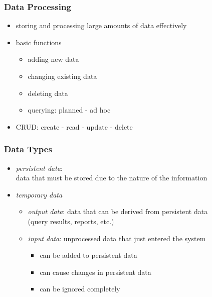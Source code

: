 \documentclass[dvipsnames]{beamer}
\theoremstyle{plain}
\begin{document}
\begin{frame}
  \frametitle{Data Processing}

  \begin{itemize}
    \item storing and processing large amounts of data effectively

    \pause
    \medskip
    \item basic functions
    \begin{itemize}
      \item adding new data
      \item changing existing data
      \item deleting data
      \item querying: planned - ad hoc
    \end{itemize}
    \item \alert{CRUD}: create - read - update - delete
  \end{itemize}
\end{frame}

\begin{frame}
  \frametitle{Data Types}

  \begin{itemize}
    \item \emph{persistent data}:\\
      data that must be stored due to the nature of the information

    \pause
    \bigskip
    \item \emph{temporary data}
    \begin{itemize}
      \item \emph{output data}: data that can be derived from persistent data\\
        (query results, reports, etc.)

      \pause
      \medskip
      \item \emph{input data}: unprocessed data that just entered the system
      \begin{itemize}
        \item can be added to persistent data
        \item can cause changes in persistent data
        \item can be ignored completely
      \end{itemize}
    \end{itemize}
  \end{itemize}
\end{frame}
\end{document}
